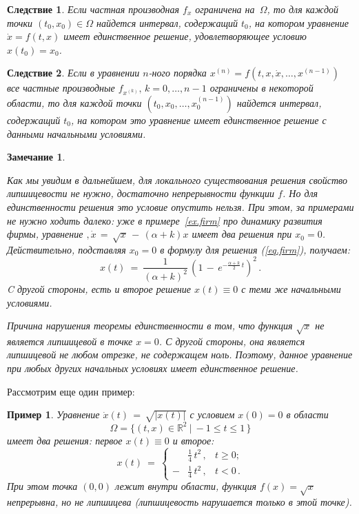 \documentclass[12pt,a4paper]{article}
\newtheorem{cor}{Следствие}
\newtheorem{remark}{Замечание}
\newtheorem{ex}{Пример}
\newcommand{\re}{{\mathbb R}}
\begin{document}
\begin{cor}\label{c.lip1}
Если частная производная $f_x$ ограничена на~$\Omega$, то для каждой точки $(t_0, x_0) \in \Omega$ найдется
интервал, содержащий $t_0$, на котором уравнение $\dot x = f(t, x)$ имеет единственное решение,
 удовлетворяющее условию $x(t_0) = x_0$.
\end{cor}
\begin{cor}\label{c.lip2}
Если в уравнении $n$-ного порядка $x^{(n)} = f(t, x, \dot x, \ldots , x^{(n-1)})$
все частные производные $f_{x^{(k)}}, \, k = 0, \ldots , n-1$ ограничены в некоторой области, то для каждой точки
$(t_0, x_0, \ldots , x_0^{(n-1)})$ найдется
интервал, содержащий $t_0$, на котором это уравнение имеет единственное решение с данными начальными условиями.
\end{cor}
\begin{remark}\label{r.non-unique}
{\em Как мы увидим в дальнейшем, для локального существования решения свойство липшицевости не нужно, достаточно непрерывности функции $f$. Но для единственности решения это условие опустить нельзя. 
При этом, за примерами не нужно ходить далеко: уже в примере~\ref{ex.firm} про динамику развития фирмы, 
уравнение $, \dot x \, = \, \sqrt{x}\, - \, (\alpha + k)x$ имеет два решения 
при $x_0 = 0$. Действительно, подставляя $x_0 = 0$ в  формулу для решения (\ref{eq.firm}), 
получаем: 
$$
x(t)\ = \ \frac{1}{(\alpha + k)^2} \, \left( 1 \, - \,  e^{- \frac{\alpha + k}{2}\, t} \right)^2 \, . 
$$
C другой стороны, есть и второе решение $x(t) \equiv 0$ с теми же начальными условиями. 

Причина нарушения теоремы единственности в том, что функция $\sqrt{x}$ не  является липшицевой в точке $x = 0$. С другой стороны, она является липшицевой не любом отрезке, не содержащем ноль. 
Поэтому, данное уравнение при любых других начальных условиях имеет единственное решение.  
}
\end{remark} 
Рассмотрим еще один пример: 
\begin{ex}\label{ex.non-unique}
{\em Уравнение $\dot x(t) \, = \, \sqrt{|x(t)|}$ с условием $x(0) = 0$ в области
$$
\Omega =
\bigl\{ (t, x) \in \re^2 \ \bigl| \ -1 \le t \le 1\, \bigr\}
$$
 имеет два решения: первое $x(t) \equiv 0$ и второе:
$$
x(t) \ = \
\left\{
\begin{array}{lll}
{}&  \frac{1}{4}\, t^2\, , & t \ge 0;\\
- &\frac{1}{4}\, t^2\,  , & t < 0\, .
\end{array}
\right.
$$
При этом точка $(0, 0)$ лежит внутри области, функция $f(x) = \sqrt{x}$ непрерывна, но не липшицева
(липшицевость нарушается только в этой точке)}.
\end{ex}
\newpage 
\end{document}
